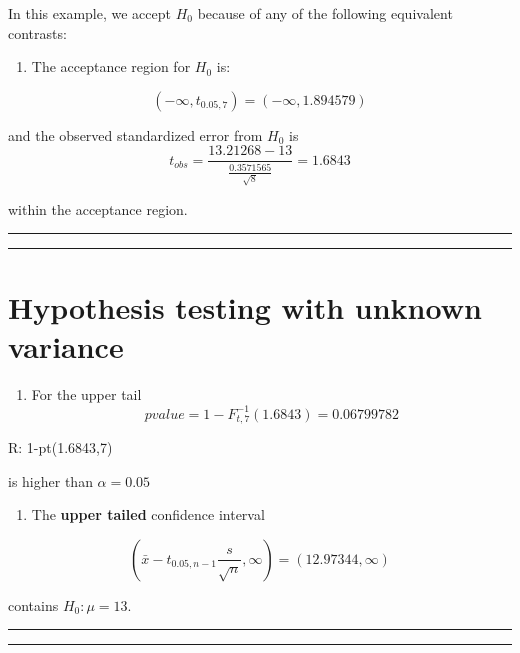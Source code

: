 \documentclass[
]{book}
\providecommand{\tightlist}{%
  \setlength{\itemsep}{0pt}\setlength{\parskip}{0pt}}
\begin{document}
In this example, we accept \(H_0\) because of any of the following equivalent contrasts:

\begin{enumerate}
\def\labelenumi{\arabic{enumi}.}
\tightlist
\item
  The acceptance region for \(H_0\) is:
\end{enumerate}

\[(-\infty, t_{0.05,7})=( -\infty,  1.894579)\]

and the observed standardized error from \(H_0\) is
\[t_{obs} =  \frac{13.21268-13}{\frac{0.3571565}{\sqrt{8}}}=1.6843\]

within the acceptance region.

\begin{center}\rule{0.5\linewidth}{0.5pt}\end{center}

\begin{center}\rule{0.5\linewidth}{0.5pt}\end{center}

\hypertarget{hypothesis-testing-with-unknown-variance-2}{%
\section{Hypothesis testing with unknown variance}\label{hypothesis-testing-with-unknown-variance-2}}

\begin{enumerate}
\def\labelenumi{\arabic{enumi}.}
\setcounter{enumi}{1}
\tightlist
\item
  For the upper tail \[pvalue=1-F^{-1}_{t,7}(1.6843)=0.06799782\]
\end{enumerate}

R: 1-pt(1.6843,7)

is higher than \(\alpha=0.05\)

\begin{enumerate}
\def\labelenumi{\arabic{enumi}.}
\setcounter{enumi}{2}
\tightlist
\item
  The \textbf{upper tailed} confidence interval
\end{enumerate}

\[(\bar{x}-t_{0.05, n-1} \frac{s}{\sqrt{n}}, \infty)=(12.97344, \infty)\]

contains \(H_0:\mu=13\).

\begin{center}\rule{0.5\linewidth}{0.5pt}\end{center}

\begin{center}\rule{0.5\linewidth}{0.5pt}\end{center}
\end{document}
